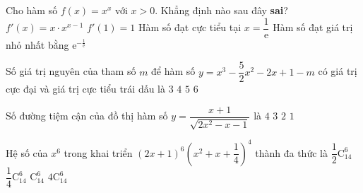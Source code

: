 \begin{ex}%
Cho hàm số $f(x) =x^x$ với $x>0$. Khẳng định nào sau đây \textbf{sai}? 
\choice
{\True $f'(x) =x \cdot x^{x-1}$}
{$f'(1)=1$}
{Hàm số đạt cực tiểu tại $x=\dfrac{1}{\mathrm{e}}$}
{Hàm số đạt giá trị nhỏ nhất bằng $\mathrm{e}^{-\frac{1}{\mathrm{e}}}$}
\end{ex}

\begin{ex}%
Số giá trị nguyên của tham số $m$ để hàm số $y=x^3-\dfrac{5}{2}x^2-2x+1-m$ có giá trị cực đại và giá trị cực tiểu trái dấu là
\choice
{$3$}
{$4$}
{$5$}
{\True $6$}
\end{ex}

\begin{ex}%
Số đường tiệm cận của đồ thị hàm số $y=\dfrac{x+1}{\sqrt{2x^2-x-1}}$ là
\choice
{\True $4$}
{$3$}
{$2$}
{$1$}
\end{ex}

\begin{ex}%
Hệ số của $x^6$ trong khai triển $(2x+1)^6\left( x^2+x+\dfrac{1}{4}\right )^4$ thành đa thức là
\choice
{$\dfrac{1}{2}\mathrm{C}_{14}^6$}
{\True $\dfrac{1}{4}\mathrm{C}_{14}^6$}
{$\mathrm{C}_{14}^6$}
{$4\mathrm{C}_{14}^6$}
\end{ex}

